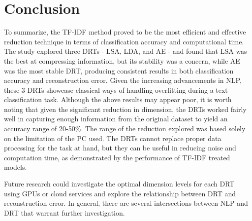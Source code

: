 \documentclass[12pt]{article}
\begin{document}
\section{Conclusion}
\hspace{\parindent} To summarize, the TF-IDF method proved to be the most efficient and effective reduction technique in terms of classification accuracy and computational time. The study explored three DRTs - LSA, LDA, and AE - and found that LSA was the best at compressing information, but its stability was a concern, while AE was the most stable DRT, producing consistent results in both classification accuracy and reconstruction error. Given the increasing advancements in NLP, these 3 DRTs showcase classical ways of handling overfitting during a text classification task. Although the above results may appear poor, it is worth noting that given the significant reduction in dimension, the DRTs worked fairly well in capturing enough information from the original dataset to yield an accuracy range of 20-50\%. The range of the reduction explored was based solely on the limitation of the PC used. The DRTs cannot replace proper data processing for the task at hand, but they can be useful in reducing noise and computation time, as demonstrated by the performance of TF-IDF treated models.

Future research could investigate the optimal dimension levels for each DRT using GPUs or cloud services and explore the relationship between DRT and reconstruction error. In general, there are several intersections between NLP and DRT that warrant further investigation.
\end{document}
